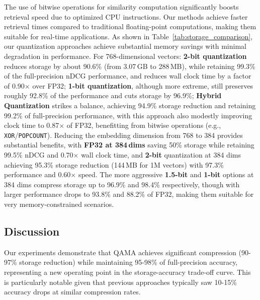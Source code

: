 The use of bitwise operations for similarity computation significantly boosts retrieval speed due to optimized CPU instructions. Our methods achieve faster retrieval times compared to traditional floating-point computations, making them suitable for real-time applications.
As shown in Table~\ref{tab:storage_comparison}, our quantization approaches achieve substantial memory savings with minimal degradation in performance. For 768-dimensional vectors:
\textbf{2-bit quantization} reduces storage by about 90.6\% (from 3.07\,GB to 288\,MB), while retaining 99.3\% of the full-precision nDCG performance, and reduces wall clock time by a factor of 0.90$\times$ over FP32; \textbf{1-bit quantization}, although more extreme, still preserves roughly 92.8\% of the performance and cuts storage by 96.9\%; \textbf{Hybrid Quantization} strikes a balance, achieving 94.9\% storage reduction and retaining 99.2\% of full-precision performance, with this approach also modestly improving clock time to 0.87$\times$ of FP32, benefitting from bitwise operations (e.g., \texttt{XOR}/\texttt{POPCOUNT}).
Reducing the embedding dimension from 768 to 384 provides substantial benefits, with \textbf{FP32 at 384\,dims} saving 50\% storage while retaining 99.5\% nDCG and 0.70$\times$ wall clock time, and \textbf{2-bit} quantization at 384 dims achieving 95.3\% storage reduction (144\,MB for 1M vectors) with 97.3\% performance and 0.60$\times$ speed. 
The more aggressive \textbf{1.5-bit} and \textbf{1-bit} options at 384 dims compress storage up to 96.9\% and 98.4\% respectively, though with larger performance drops to 93.8\% and 88.2\% of FP32, making them suitable for very memory-constrained scenarios.

\subsection{Discussion}
Our experiments demonstrate that QAMA achieves significant compression (90-97\% storage reduction) while maintaining 95-98\% of full-precision accuracy, representing a new operating point in the storage-accuracy trade-off curve. This is particularly notable given that previous approaches typically saw 10-15\% accuracy drops at similar compression rates.

